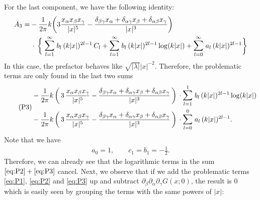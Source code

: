 For the last component, we have the following identity:
\begin{align*}
  A_3 = 
  & - \frac{1}{2\pi} k \bigg( 3 \frac{x_\alpha x_\beta x_\gamma}{|x|^5} - \frac{\delta_{\beta\gamma} x_\alpha + \delta_{\alpha\gamma} x_\beta + \delta_{\alpha\beta} x_\gamma}{|x|^3} \bigg)  \\
  &\,\cdot\, \bigg\{ 
  \; \mathlarger{\sum}_{l = 1}^\infty \; b_l \, (k|x|)^{2l - 1} \, C_l 
  + \mathlarger{\sum}_{l = 1}^\infty \; b_l \, (k|x|)^{2l - 1} \log(k|x|) 
  + \mathlarger{\sum}_{l = 0}^\infty \; a_l \, (k|x|)^{2l - 1} 
  \bigg\}
\end{align*}
In this case, the prefactor behaves like $\sqrt{|\lambda|} |x|^{-2}$.
Therefore, the problematic terms are only found in the last two sums
\begin{align}
  \label{eq:P3}
  \tag{P3}
  \begin{alignedat}{1}
    &- \frac{1}{2\pi} k\, \bigg( \, 3\, \frac{x_\alpha x_\beta x_\gamma}{|x|^5} - \frac{\delta_{\beta\gamma} x_\alpha + \delta_{\alpha\gamma} x_\beta + \delta_{\alpha\beta} x_\gamma}{|x|^3} \, \bigg)
  \, \cdot \mathlarger{\sum}_{l = 1}^1 \; b_l \, (k|x|)^{2l - 1} \log(k|x|)  \\
    &- \frac{1}{2\pi} k\, \bigg( \, 3\, \frac{x_\alpha x_\beta x_\gamma}{|x|^5} - \frac{\delta_{\beta\gamma} x_\alpha + \delta_{\alpha\gamma} x_\beta + \delta_{\alpha\beta} x_\gamma}{|x|^3} \, \bigg)
  \, \cdot \mathlarger{\sum}_{l = 0}^0 \; a_l \, (k|x|)^{2l - 1} .
  \end{alignedat}
\end{align}
Note that we have
\begin{align*}
  a_0 = 1, \qquad c_1 = b_1 = - \frac{1}{2}.
\end{align*}
Therefore, we can already see that the logarithmic terms in the sum $\eqref{eq:P2} + \eqref{eq:P3}$ cancel.
Next, we observe that if we add the problematic terms \eqref{eq:P1}, \eqref{eq:P2} and \eqref{eq:P3} up and subtract $\partial_\beta \partial_\alpha \partial_\gamma G(x; 0)$, the result is $0$ which is easily seen by grouping the terms with the same powers of $|x|$:
